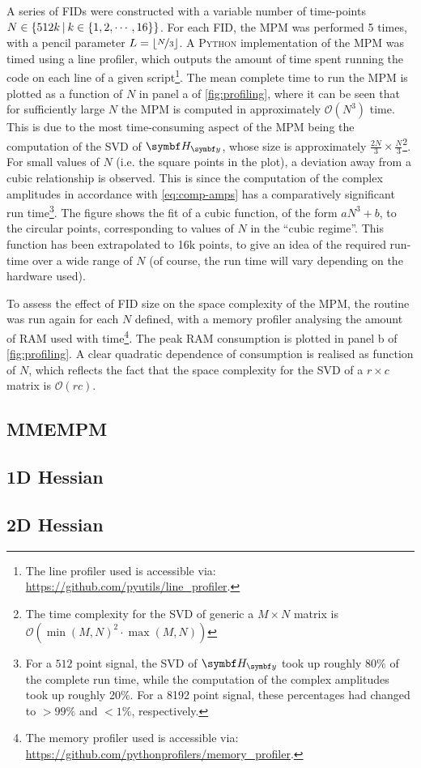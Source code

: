 A series of \acp{FID} were constructed with a variable number of time-points
$N \in \lbrace 512k \hspace*{2pt} \vert \hspace*{2pt} k \in \lbrace 1, 2,
\cdots, 16 \rbrace \rbrace$. For each \ac{FID}, the \ac{MPM} was performed 5
times, with a pencil parameter $L = \lfloor \nicefrac{N}{3} \rfloor$.
A \textsc{Python} implementation of the \ac{MPM} was timed using a line
profiler, which outputs the amount of time spent running the code on each line of a
given script\footnote{
    The line profiler used is accessible via:
    \url{https://github.com/pyutils/line_profiler}.
}. The mean complete time to run the \ac{MPM} is plotted as a
function
of $N$ in panel a of \cref{fig:profiling}, where it can be seen that for
sufficiently large $N$ the \ac{MPM} is computed in approximately
$\mathcal{O}({N}^3)$ time. This is due to the most time-consuming aspect of the
\ac{MPM} being the computation of the \ac{SVD} of $\Hy$, whose size is
approximately $\tfrac{2N}{3} \times \tfrac{N}{3}$\footnote{
    The time complexity for the \ac{SVD} of generic a $M \times N$ matrix is
    $\mathcal{O}(\operatorname{min}(M, N)^2 \cdot \operatorname{max}(M, N))$
}. For small values of $N$ (i.e. the square points in the plot), a deviation
away from a cubic relationship is observed. This is since the computation of
the complex amplitudes in accordance with \cref{eq:comp-amps} has a
comparatively significant run time\footnote{
    For a $512$ point signal, the \ac{SVD} of $\Hy$ took up roughly 80\% of the
    complete run time, while the computation of the complex amplitudes took up
    roughly 20\%. For a 8192 point signal, these percentages had changed to
    $>\!99\%$ and $<\!1\%$, respectively.
}. The figure shows the fit of a cubic function, of the form $aN^3 + b$, to the
circular points, corresponding to values of $N$ in the ``cubic regime''.
This function has been extrapolated to 16k points, to give an idea of the
required run-time over a wide range of $N$ (of course, the run time will vary
depending on the hardware used).

To assess the effect of \ac{FID} size on the space complexity of the \ac{MPM},
the routine was run again for each $N$ defined, with a memory profiler
analysing the amount of \ac{RAM} used with time\footnote{
 The memory profiler used is accessible via:
 \url{https://github.com/pythonprofilers/memory_profiler}.
}. The peak \ac{RAM} consumption is plotted in panel b of \cref{fig:profiling}.
A clear quadratic dependence of consumption is realised as function of $N$,
which reflects the fact that the space complexity for the \ac{SVD} of a $r
\times c$ matrix is  $\mathcal{O}(rc)$.

\subsection{\acs{MMEMPM}}

\subsection{\acs{1D} Hessian}

\subsection{\acs{2D} Hessian}

